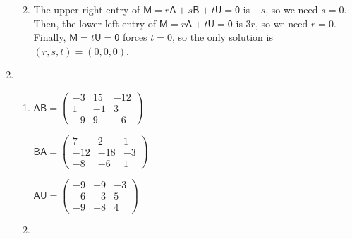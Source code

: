 \begin{enumerate}
\begin{enumerate}
\begin{equation*}
\end{equation*}
\item The upper right entry of $\mathsf{M} = r\mathsf{A} + s\mathsf{B} + t\mathsf{U} = \mathsf{0}$ is $-s$, so we need $s = 0$. Then, the lower left entry of $\mathsf{M} = r\mathsf{A} + t\mathsf{U} = \mathsf{0}$ is $3r$, so we need $r = 0$. Finally, $\mathsf{M} = t\mathsf{U} = \mathsf{0}$ forces $t = 0$, so the only solution is $(r,s,t) = (0,0,0)$.
\end{enumerate}
\item \begin{enumerate}
\item $\mathsf{AB} = \begin{pmatrix} -3 & 15 & -12 \\ 1 & -1 & 3 \\ -9 & 9 & -6 \end{pmatrix}$\par
$\mathsf{BA} = \begin{pmatrix} 7 & 2 & 1 \\ -12 & -18 & -3 \\ -8 & -6 & 1 \end{pmatrix}$\par
$\mathsf{AU} = \begin{pmatrix} -9 & -9 & -3 \\ -6 & -3 & 5 \\ -9 & -8 & 4 \end{pmatrix}$
\item 
\end{enumerate}
\end{enumerate}